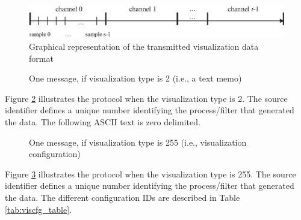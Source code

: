 \documentclass[letterpaper,oneside,12pt]{book}
\begin{document}
\begin{figure}[ht]
 \centerline{\includegraphics{figures/visualization_type1.eps}}
 \caption{Graphical representation of the transmitted visualization data format}
 \label{visualization_type1}
\end{figure}

\begin{figure}[ht]
 \centerline{}
 \caption{One message, if visualization type is 2 (i.e., a text memo)}
 \label{visualizationprotocol_type2}
\end{figure}

Figure \ref{visualizationprotocol_type2} illustrates the protocol when the 
visualization type is 2. The source identifier defines a unique number 
identifying the process/filter that generated the data. The following ASCII
text is zero delimited.

\begin{figure}[ht]
 \centerline{}
 \caption{One message, if visualization type is 255 (i.e., visualization configuration)}
 \label{visualizationprotocol_type255}
\end{figure}

Figure \ref{visualizationprotocol_type255} illustrates the protocol when the 
visualization type is 255. The source identifier defines a unique number 
identifying the process/filter that generated the data. The different 
configuration IDs are described in Table \ref{tab:viscfg_table}.
\end{document}
